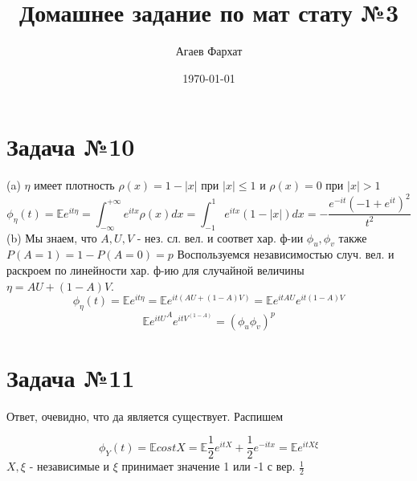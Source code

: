\documentclass[a4paper, 12pt]{article} %
\author{Агаев Фархат}
\title{Домашнее задание по мат стату №3}
\date{\today}
\begin{document}

\maketitle
\section*{Задача №10}
(a)
 $\eta$ имеет плотность $\rho(x) = 1 - |x|$ при $|x| \leq 1$ 
и $\rho(x) = 0$ при $|x| > 1$
 \[
   \phi_{\eta}(t) = \mathds{E}e^{it\eta} = \int_{-\infty}^{+\infty}e^{itx}\rho(x)dx = \int_{-1}^{1} e^{itx}(1 - |x|)dx = -\frac{e^{-it}(-1 + e^{it})^2}{t^2}
    \]
(b) Мы знаем, что $A,U,V$ - нез. сл. вел. и соответ хар. ф-ии 
$\phi_u, \phi_v$ также $P(A = 1) = 1 - P(A = 0) = p$ 
Воспользуемся независимостью случ. вел. и раскроем по линейности хар. ф-ию
для случайной величины  $\eta = AU + (1 - A)V$.
\[
   \phi_{\eta}(t) = \mathds{E}e^{it\eta} = \mathds{E}e^{it(AU + (1 - A)V)} = 
   \mathds{E}e^{itAU}e^{it(1 - A)V}
    \]
    \[
        \mathds{E}{e^{itU}}^Ae^{itV^{(1 - A)}} = (\phi_u\phi_v)^p
    \]
\section*{Задача №11}
Ответ, очевидно, что да является существует. Распишем

\[
\phi_Y(t) = \mathds{E}costX = \mathds{E}\frac{1}{2} e^{itX} + \frac{1}{2}e^{-itx} 
= \mathds{E}e^{itX\xi}
\]
$X, \xi$ - независимые и $\xi$ принимает значение 1 или -1 с вер. $\frac{1}{2}$
 
\end{document}
